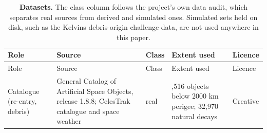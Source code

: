 \documentclass[3p,times]{elsarticle}
\begin{document}
\begin{longtable}[]{@{}
  >{\raggedright\arraybackslash}p{}
  >{\raggedright\arraybackslash}p{}
  >{\raggedright\arraybackslash}p{}
  >{\raggedright\arraybackslash}p{}
  >{\raggedright\arraybackslash}p{}@{}}
\caption{\textbf{Datasets.} The class column follows the project's own
data audit, which separates real sources from derived and simulated
ones. Simulated sets held on disk, such as the Kelvins debris-origin
challenge data, are not used anywhere in this
paper.}\label{tbl:datasets}\tabularnewline
\toprule\noalign{}
\begin{minipage}[b]{\linewidth}\raggedright
Role
\end{minipage} & \begin{minipage}[b]{\linewidth}\raggedright
Source
\end{minipage} & \begin{minipage}[b]{\linewidth}\raggedright
Class
\end{minipage} & \begin{minipage}[b]{\linewidth}\raggedright
Extent used
\end{minipage} & \begin{minipage}[b]{\linewidth}\raggedright
Licence
\end{minipage} \\
\midrule\noalign{}
\endfirsthead
\toprule\noalign{}
\begin{minipage}[b]{\linewidth}\raggedright
Role
\end{minipage} & \begin{minipage}[b]{\linewidth}\raggedright
Source
\end{minipage} & \begin{minipage}[b]{\linewidth}\raggedright
Class
\end{minipage} & \begin{minipage}[b]{\linewidth}\raggedright
Extent used
\end{minipage} & \begin{minipage}[b]{\linewidth}\raggedright
Licence
\end{minipage} \\
\midrule\noalign{}
\endhead
\bottomrule\noalign{}
\endlastfoot
Catalogue (re-entry, debris) & General Catalog of Artificial Space
Objects, release 1.8.8; CelesTrak catalogue and space weather & real &
64,516 objects below 2000 km perigee; 32,970 natural decays & Creative

\end{longtable}
\end{document}
